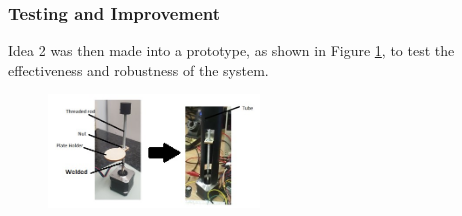 \documentclass[11pt,landscape]{article}
\begin{document}
\begin{multicols}{2}
    
    \subsubsection{Testing and Improvement}
    Idea 2 was then made into a prototype, as shown in Figure \ref{fig:release},
    to test the effectiveness and robustness of the system. 
    
    \begin{figure}[H]
        \begin{center}
            \includegraphics[width=0.5\textwidth]{Figure20.jpg}
            \label{fig:release}
        \end{center}
    \end{figure}
    

\end{multicols}
\end{document}
